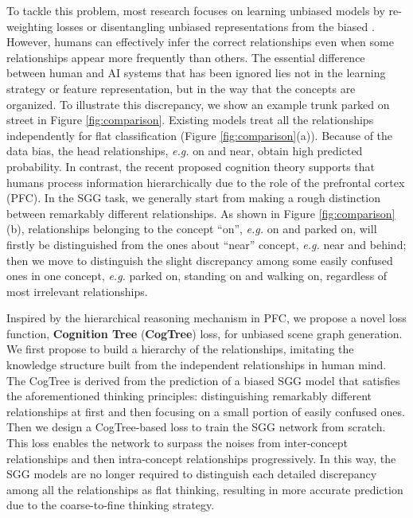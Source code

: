 \documentclass[letterpaper]{article} \usepackage{aaai21}  \usepackage{times}  \usepackage{helvet} \usepackage{courier}  \usepackage[hyphens]{url}  \usepackage{graphicx} \urlstyle{rm} \def\UrlFont{\rm}  \usepackage{natbib}  \usepackage{caption} \frenchspacing  \setlength{\pdfpagewidth}{8.5in}  \setlength{\pdfpageheight}{11in}  \usepackage{amsmath,amsthm}
\begin{document}
To tackle this problem, most research focuses on learning unbiased models by re-weighting losses \cite{zareian2020bridging} or disentangling unbiased representations from the biased \cite{Tang2020Unbiased}. However, humans can effectively infer the correct relationships even when some relationships appear more frequently than others. The essential difference between human and AI systems that has been ignored lies not in the learning strategy or feature representation, but in the way that the concepts are organized. To illustrate this discrepancy, we show an example {\ttfamily trunk parked on street} in Figure \ref{fig:comparison}. Existing models treat all the relationships independently for flat classification (Figure \ref{fig:comparison}(a)). Because of the data bias, the head relationships, \textit{e.g.} {\ttfamily on} and {\ttfamily near}, obtain high predicted probability. In contrast, the recent proposed cognition theory \cite{Sarafyazd2019Hierarchical} supports that humans process information hierarchically due to the  role  of  the  prefrontal  cortex  (PFC). In the SGG task, we generally start from making a rough distinction between remarkably different relationships. As shown in Figure \ref{fig:comparison}(b), relationships belonging to the concept  ``on'',
\textit{e.g.} {\ttfamily on} and {\ttfamily parked on}, will firstly be distinguished from the ones about ``near'' concept, \textit{e.g.} {\ttfamily near} and {\ttfamily behind}; then we move to distinguish the slight discrepancy among some easily confused ones in one concept, \textit{e.g.} {\ttfamily parked on}, {\ttfamily standing on} and {\ttfamily walking on}, regardless of most irrelevant relationships. 

Inspired by the hierarchical reasoning mechanism in PFC, we propose a  novel loss function, \textbf{Cognition Tree} (\textbf{CogTree}) loss, for unbiased scene graph generation. We first propose to build a hierarchy of the relationships, imitating the knowledge structure built from the independent relationships in human mind. The CogTree is derived from the prediction of a biased SGG model that satisfies the aforementioned  thinking principles: distinguishing remarkably different relationships at first and then 
focusing on a small portion of easily confused ones. Then we design a CogTree-based loss to train the SGG network from scratch. This loss enables the network to surpass the noises from inter-concept relationships and then intra-concept relationships progressively. In this way, the SGG models are no longer required to distinguish each detailed discrepancy among all the relationships as flat thinking, resulting in 
more accurate prediction due to the coarse-to-fine thinking strategy.  
\end{document}
